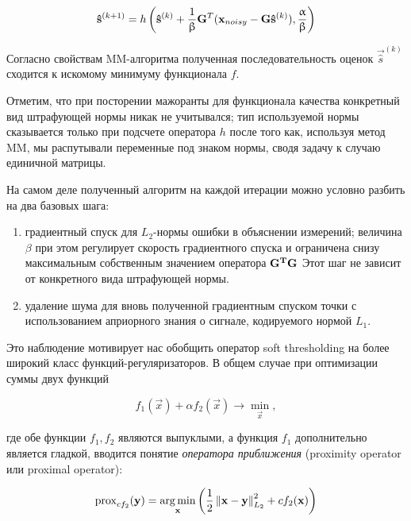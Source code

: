\begin{equation}
    \mathbf{\hat{s}}^{(k+1)} = h\left(\mathbf{\hat{s}}^{(k)} + \frac{1}{\upbeta} \mathbf{G}^T(\mathbf{x}_{noisy} - \mathbf{G} \mathbf{\hat{s}}^{(k)}), \frac{\upalpha}{\upbeta}\right)
    \label{eq:fista_next_iter_soft_thresh}
\end{equation}

Согласно свойствам MM-алгоритма полученная последовательность оценок
$\vec{\hat{s}}^{(k)}$ сходится к искомому минимуму функционала $f$.

Отметим, что при посторении мажоранты для функционала качества конкретный вид
штрафующей нормы никак не учитывался; тип используемой нормы сказывается только
при подсчете оператора $h$ после того как, используя метод MM, мы распутывали
переменные под знаком нормы, сводя задачу к случаю единичной матрицы.

На самом деле полученный алгоритм на каждой итерации можно условно разбить на два базовых
шага: 

\begin{enumerate}
    \item градиентный спуск для $L_2$-нормы ошибки в объяснении измерений;
        величина $\beta$ при этом регулирует скорость градиентного спуска и ограничена
        снизу максимальным собственным значением оператора $\mathbf{G^TG}$
        Этот шаг не зависит от конкретного вида штрафующей нормы.
    \item удаление шума для вновь полученной градиентным спуском точки с
        использованием априорного знания о сигнале, кодируемого нормой $L_1$.
\end{enumerate}

Это наблюдение мотивирует нас обобщить оператор soft thresholding на
более широкий класс функций-регуляризаторов. В общем случае
при оптимизации суммы двух функций

\begin{equation}
    f_1(\vec{x}) + \alpha f_2(\vec{x}) \rightarrow \underset{\vec{x}}\min,
\end{equation}

где обе функции $f_1, f_2$ являются выпуклыми, а функция $f_1$ дополнительно
является гладкой, вводится понятие \emph{оператора приближения} (proximity
operator или proximal operator):

\begin{equation}
    \operatorname{prox}_{c f_2}(\mathbf{y}) = \operatorname*{arg\,min}_{\mathbf{x}}\left(\frac{1}{2}\left\lVert\mathbf{x - y}\right\rVert^2_{L_2} + c f_2(\mathbf{x})\right)
    \label{eq:prox_operator_def}
\end{equation}

